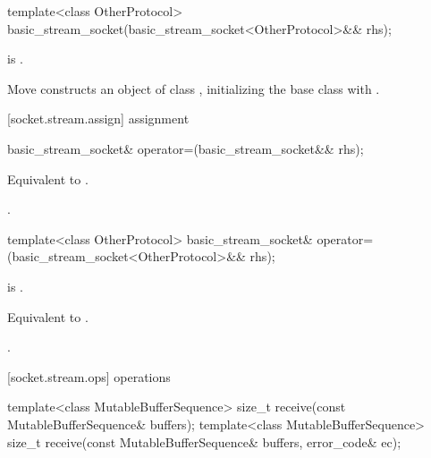 \begin{itemdecl}
template<class OtherProtocol>
  basic_stream_socket(basic_stream_socket<OtherProtocol>&& rhs);
\end{itemdecl}

\begin{itemdescr}
\pnum
\constraints {} is .

\pnum
\effects Move constructs an object of class , initializing the base class with .
\end{itemdescr}



[socket.stream.assign]{ assignment}

\begin{itemdecl}
basic_stream_socket& operator=(basic_stream_socket&& rhs);
\end{itemdecl}

\begin{itemdescr}
\pnum
\effects Equivalent to .

\pnum
\returns {}.
\end{itemdescr}

\begin{itemdecl}
template<class OtherProtocol>
  basic_stream_socket& operator=(basic_stream_socket<OtherProtocol>&& rhs);
\end{itemdecl}

\begin{itemdescr}
\pnum
\constraints {} is .

\pnum
\effects Equivalent to .

\pnum
\returns {}.
\end{itemdescr}



[socket.stream.ops]{ operations}

\begin{itemdecl}
template<class MutableBufferSequence>
  size_t receive(const MutableBufferSequence& buffers);
template<class MutableBufferSequence>
  size_t receive(const MutableBufferSequence& buffers,
                 error_code& ec);
\end{itemdecl}

